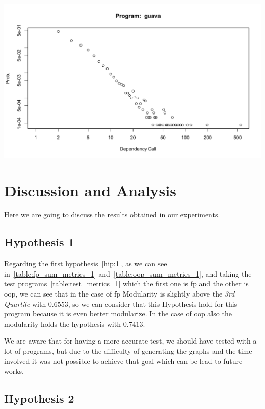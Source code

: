 \documentclass[12pt, a4paper]{article}
\begin{document}
  \begin{minipage}[t]{\linewidth}
    \includegraphics[width=\textwidth]{power_law_oop.png}
    \captionsetup{type=figure}
    \label{fig:power_law_oop}
  \end{minipage}

\section{Discussion and Analysis}

Here we are going to discuss the results obtained in our experiments.

\subsection{Hypothesis 1}

Regarding the first hypothesis~\ref{hip:1}, as we can see in~\ref{table:fp_sum_metrics_1} and~\ref{table:oop_sum_metrics_1}, and taking
the test programs~\ref{table:test_metrics_1} which the first one is \acrshort{fp} and the other is \acrshort{oop}, we can see that in the case
of \acrshort{fp} Modularity is slightly above the \textit{3rd Quartile} with $0.6553$, so we can consider that this Hypothesis hold for this program because
it is even better modularize. In the case of \acrshort{oop} also the modularity holds the hypothesis with $0.7413$.

We are aware that for having a more accurate test, we should have tested with a lot of programs, but due to the difficulty of generating the graphs and the time
involved it was not possible to achieve that goal which can be lead to future works.

\subsection{Hypothesis 2}
\end{document}
